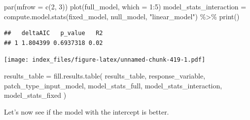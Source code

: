 \documentclass[
]{article}
\newenvironment{Shaded}{\begin{snugshade}}{\end{snugshade}}
\newcommand{\AttributeTok}[1]{\textcolor[rgb]{0.77,0.63,0.00}{#1}}
\newcommand{\DecValTok}[1]{\textcolor[rgb]{0.00,0.00,0.81}{#1}}
\newcommand{\FunctionTok}[1]{\textcolor[rgb]{0.00,0.00,0.00}{#1}}
\newcommand{\NormalTok}[1]{#1}
\newcommand{\OtherTok}[1]{\textcolor[rgb]{0.56,0.35,0.01}{#1}}
\newcommand{\SpecialCharTok}[1]{\textcolor[rgb]{0.00,0.00,0.00}{#1}}
\newcommand{\StringTok}[1]{\textcolor[rgb]{0.31,0.60,0.02}{#1}}
\begin{document}
\begin{Shaded}
\begin{Highlighting}[]
\FunctionTok{par}\NormalTok{(}\AttributeTok{mfrow =} \FunctionTok{c}\NormalTok{(}\DecValTok{2}\NormalTok{, }\DecValTok{3}\NormalTok{))}
\FunctionTok{plot}\NormalTok{(full\_model, }\AttributeTok{which =} \DecValTok{1}\SpecialCharTok{:}\DecValTok{5}\NormalTok{)}
\NormalTok{model\_stats\_interaction }\OtherTok{=} \FunctionTok{compute.model.stats}\NormalTok{(fixed\_model,}
\NormalTok{                                              null\_model,}
                                              \StringTok{"linear\_model"}\NormalTok{) }\SpecialCharTok{\%\textgreater{}\%}
  \FunctionTok{print}\NormalTok{()}
\end{Highlighting}
\end{Shaded}

\begin{verbatim}
##   deltaAIC   p_value   R2
## 1 1.804399 0.6937318 0.02
\end{verbatim}

\texttt{[image: index\_files/figure-latex/unnamed-chunk-419-1.pdf]}

\begin{Shaded}
\begin{Highlighting}[]
\NormalTok{results\_table }\OtherTok{=} \FunctionTok{fill.results.table}\NormalTok{(}
\NormalTok{  results\_table,}
\NormalTok{  response\_variable,}
\NormalTok{  patch\_type\_input\_model,}
\NormalTok{  model\_stats\_full,}
\NormalTok{  model\_stats\_interaction,}
\NormalTok{  model\_stats\_fixed}
\NormalTok{)}
\end{Highlighting}
\end{Shaded}

Let's now see if the model with the intercept is better.
\end{document}
